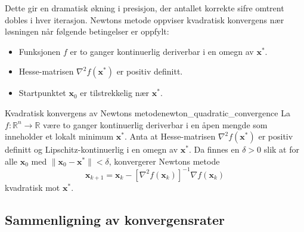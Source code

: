 Dette gir en dramatisk økning i presisjon, der antallet korrekte sifre omtrent dobles i hver iterasjon. Newtons metode oppviser kvadratisk konvergens nær løsningen når følgende betingelser er oppfylt:
\begin{itemize}
	\item Funksjonen \(f\) er to ganger kontinuerlig deriverbar i en omegn av \(\symbf{x}^\ast\).
	\item Hesse-matrisen \(\nabla^2 f(\symbf{x}^\ast)\) er positiv definitt.
	\item Startpunktet \(\symbf{x}_0\) er tilstrekkelig nær \(\symbf{x}^\ast\).
\end{itemize}

\begin{theorem}{Kvadratisk konvergens av Newtons metode}{newton_quadratic_convergence}
	La \(f: \mathbb{R}^n \to \mathbb{R}\) være to ganger kontinuerlig deriverbar i en åpen mengde som inneholder et lokalt minimum \(\symbf{x}^\ast\). Anta at Hesse-matrisen \(\nabla^2 f(\symbf{x}^\ast)\) er positiv definitt og Lipschitz-kontinuerlig i en omegn av \(\symbf{x}^\ast\). Da finnes en \(\delta > 0\) slik at for alle \(\symbf{x}_0\) med \(\|\symbf{x}_0 - \symbf{x}^\ast\| < \delta\), konvergerer Newtons metode
	\[
		\symbf{x}_{k+1} = \symbf{x}_k - [\nabla^2 f(\symbf{x}_k)]^{-1}\nabla f(\symbf{x}_k)
	\]
	kvadratisk mot \(\symbf{x}^\ast\).
\end{theorem}

\subsection{Sammenligning av konvergensrater}

